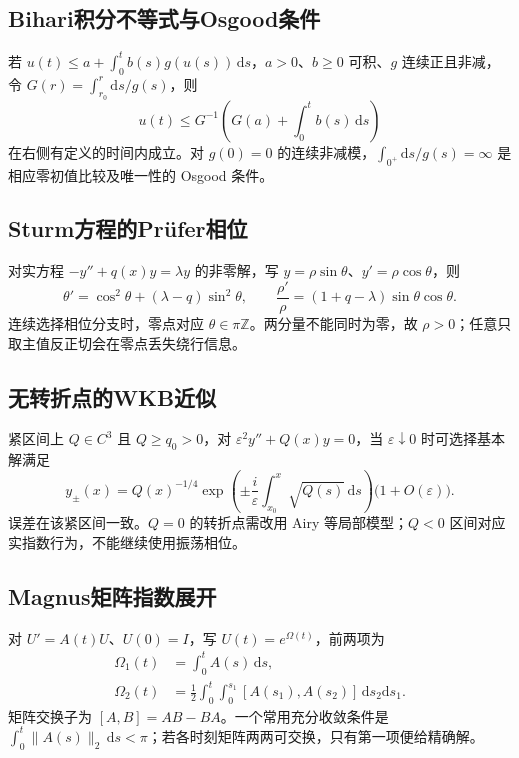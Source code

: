 \documentclass[../main.tex]{subfiles}
\begin{document}
\subsection{Bihari积分不等式与Osgood条件}
若 $u(t)\le a+\int_0^tb(s)g(u(s))\,\mathrm ds$，$a>0$、$b\ge0$ 可积、$g$ 连续正且非减，令 $G(r)=\int_{r_0}^r\mathrm ds/g(s)$，则
\[
u(t)\le G^{-1}\left(G(a)+\int_0^tb(s)\,\mathrm ds\right)
\]
在右侧有定义的时间内成立。对 $g(0)=0$ 的连续非减模，$\int_{0^+}\mathrm ds/g(s)=\infty$ 是相应零初值比较及唯一性的 Osgood 条件。
\subsection{Sturm方程的Prüfer相位}
对实方程 $-y''+q(x)y=\lambda y$ 的非零解，写 $y=\rho\sin\theta$、$y'=\rho\cos\theta$，则
\[
\theta'=\cos^2\theta+(\lambda-q)\sin^2\theta,\qquad
\frac{\rho'}\rho=(1+q-\lambda)\sin\theta\cos\theta.
\]
连续选择相位分支时，零点对应 $\theta\in\pi\mathbb Z$。两分量不能同时为零，故 $\rho>0$；任意只取主值反正切会在零点丢失绕行信息。
\subsection{无转折点的WKB近似}
紧区间上 $Q\in C^3$ 且 $Q\ge q_0>0$，对 $\varepsilon^2y''+Q(x)y=0$，当 $\varepsilon\downarrow0$ 时可选择基本解满足
\[
y_\pm(x)=Q(x)^{-1/4}
\exp\left(\pm\frac{i}{\varepsilon}\int_{x_0}^x\sqrt{Q(s)}\,\mathrm ds\right)
\bigl(1+O(\varepsilon)\bigr).
\]
误差在该紧区间一致。$Q=0$ 的转折点需改用 Airy 等局部模型；$Q<0$ 区间对应实指数行为，不能继续使用振荡相位。
\subsection{Magnus矩阵指数展开}
对 $U'=A(t)U$、$U(0)=I$，写 $U(t)=e^{\Omega(t)}$，前两项为
\begin{align*}
\Omega_1(t)&=\int_0^tA(s)\,\mathrm ds,\\
\Omega_2(t)&=\frac12\int_0^t\int_0^{s_1}
[A(s_1),A(s_2)]\,\mathrm ds_2\mathrm ds_1.
\end{align*}
矩阵交换子为 $[A,B]=AB-BA$。一个常用充分收敛条件是 $\int_0^t\|A(s)\|_2\,\mathrm ds<\pi$；若各时刻矩阵两两可交换，只有第一项便给精确解。
\clearpage
\end{document}
